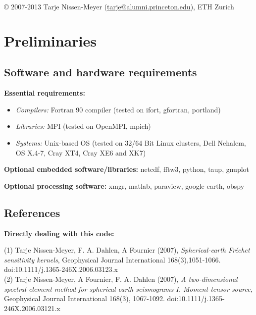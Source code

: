 \documentclass[11pt,letter,fleqn,english,notitlepage]{article}
\begin{document}
\noindent \copyright  \hspace*{0.1cm} 
2007-2013 Tarje Nissen-Meyer (\url{tarje@alumni.princeton.edu}), ETH Zurich

\newpage
\tableofcontents
\newpage

\section{Preliminaries}

\subsection{Software and hardware requirements}

\textbf{Essential requirements:} 
\begin{itemize}
\item \textit{Compilers:} Fortran 90 compiler (tested on ifort, gfortran, portland)
\item \textit{Libraries:} MPI (tested on OpenMPI, mpich)
\item \textit{Systems:} Unix-based OS (tested on 32/64 Bit Linux clusters, Dell Nehalem, OS X.4-7, Cray XT4,
Cray XE6 and XK7)
\end{itemize}

\textbf{Optional embedded software/libraries:} netcdf, fftw3, python, taup, gnuplot

\textbf{Optional processing software:} xmgr, matlab, paraview, google earth, obspy
\subsection{References}

\noindent \textbf{Directly dealing with this code:}\vspace*{0.2cm}

(1) Tarje Nissen-Meyer, F. A. Dahlen, A Fournier (2007),
\textit{Spherical-earth Fr\'{e}chet sensitivity kernels},        
Geophysical Journal International 168(3),1051-1066. 
doi:10.1111/j.1365-246X.2006.03123.x                \\
                                                        
(2) Tarje Nissen-Meyer, A Fournier, F. A. Dahlen (2007), 
\textit{A two-dimensional spectral-element method for
spherical-earth seismograms-I. Moment-tensor source}, 
Geophysical Journal International 168(3), 1067-1092. 
doi:10.1111/j.1365-246X.2006.03121.x                 \\
                                                       
\end{document}
